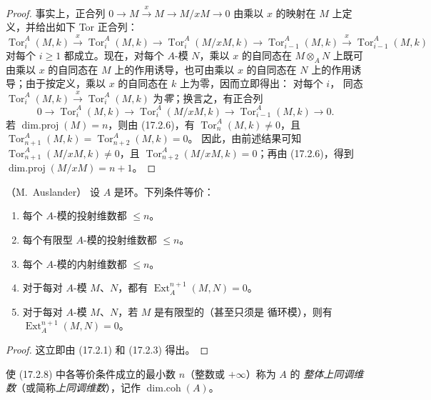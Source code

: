 \begin{proof}
事实上，正合列
$0\longrightarrow M\xrightarrow{x}M\longrightarrow M/xM\longrightarrow0$
由乘以 $x$ 的映射在 $M$ 上定义，并给出如下 Tor 正合列：
\[
  \operatorname{Tor}^A_i(M,k)\xrightarrow{x}
  \operatorname{Tor}^A_i(M,k)\longrightarrow
  \operatorname{Tor}^A_i(M/xM,k)\longrightarrow
  \operatorname{Tor}^A_{i-1}(M,k)\xrightarrow{x}
  \operatorname{Tor}^A_{i-1}(M,k)
\]
对每个 $i\geq1$ 都成立。现在，对每个 $A$-模 $N$，乘以 $x$ 的自同态在
$M\otimes_A N$ 上既可由乘以 $x$ 的自同态在 $M$ 上的作用诱导，也可由乘以 $x$
的自同态在 $N$ 上的作用诱导；由于按定义，乘以 $x$ 的自同态在 $k$ 上为零，因而立即得出：
对每个 $i$，
同态
$\operatorname{Tor}^A_i(M,k)\xrightarrow{x}\operatorname{Tor}^A_i(M,k)$
为\emph{零}；换言之，有正合列
\[
  0\longrightarrow\operatorname{Tor}^A_i(M,k)\longrightarrow
  \operatorname{Tor}^A_i(M/xM,k)\longrightarrow
  \operatorname{Tor}^A_{i-1}(M,k)\longrightarrow0.
\]
若 $\operatorname{dim.proj}(M)=n$，则由 (17.2.6)，有
$\operatorname{Tor}^A_n(M,k)\neq0$，且
$\operatorname{Tor}^A_{n+1}(M,k)=\operatorname{Tor}^A_{n+2}(M,k)=0$。
因此，由前述结果可知
$\operatorname{Tor}^A_{n+1}(M/xM,k)\neq0$，且
$\operatorname{Tor}^A_{n+2}(M/xM,k)=0$；再由 (17.2.6)，得到
$\operatorname{dim.proj}(M/xM)=n+1$。
\end{proof}

\begin{proposition}[17.2.8]
\label{0.17.2.8-fr}
\textnormal{（M.~Auslander）} 设 $A$ 是环。下列条件等价：
\begin{enumerate}
  \item[\rm a)] 每个 $A$-模的投射维数都 $\leq n$。
  \item[\rm a')] 每个有限型 $A$-模的投射维数都 $\leq n$。
  \item[\rm b)] 每个 $A$-模的内射维数都 $\leq n$。
  \item[\rm c)] 对于每对 $A$-模 $M$、$N$，都有
  $\operatorname{Ext}^{n+1}_A(M,N)=0$。
  \item[\rm c')] 对于每对 $A$-模 $M$、$N$，若 $M$ 是有限型的（甚至只须是
  循环模），则有 $\operatorname{Ext}^{n+1}_A(M,N)=0$。
\end{enumerate}
\end{proposition}

\begin{proof}
这立即由 (17.2.1) 和 (17.2.3) 得出。
\end{proof}

使 (17.2.8) 中各等价条件成立的最小数 $n$（整数或 $+\infty$）称为 $A$ 的
\emph{整体上同调维数}（或简称\emph{上同调维数}），记作
$\operatorname{dim.coh}(A)$。

